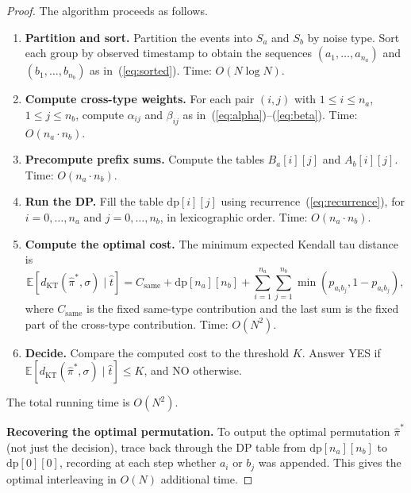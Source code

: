 \documentclass[11pt]{article}
\begin{document}
\begin{proof}
The algorithm proceeds as follows.

\begin{enumerate}
\item \textbf{Partition and sort.} Partition the events into $S_a$ and $S_b$ by noise type. Sort each group by observed timestamp to obtain the sequences $(a_1, \ldots, a_{n_a})$ and $(b_1, \ldots, b_{n_b})$ as in~(\ref{eq:sorted}). Time: $O(N \log N)$.

\item \textbf{Compute cross-type weights.} For each pair $(i, j)$ with $1 \le i \le n_a$, $1 \le j \le n_b$, compute $\alpha_{ij}$ and $\beta_{ij}$ as in~(\ref{eq:alpha})--(\ref{eq:beta}). Time: $O(n_a \cdot n_b)$.

\item \textbf{Precompute prefix sums.} Compute the tables $B_a[i][j]$ and $A_b[i][j]$. Time: $O(n_a \cdot n_b)$.

\item \textbf{Run the DP.} Fill the table $\mathrm{dp}[i][j]$ using recurrence~(\ref{eq:recurrence}), for $i = 0, \ldots, n_a$ and $j = 0, \ldots, n_b$, in lexicographic order. Time: $O(n_a \cdot n_b)$.

\item \textbf{Compute the optimal cost.} The minimum expected Kendall tau distance is
\begin{equation}
\mathbb{E}[d_{\mathrm{KT}}(\hat{\pi}^*, \sigma) \mid \hat{t}] = C_{\mathrm{same}} + \mathrm{dp}[n_a][n_b] + \sum_{i=1}^{n_a}\sum_{j=1}^{n_b} \min(p_{a_i b_j}, 1 - p_{a_i b_j}),
\end{equation}
where $C_{\mathrm{same}}$ is the fixed same-type contribution and the last sum is the fixed part of the cross-type contribution. Time: $O(N^2)$.

\item \textbf{Decide.} Compare the computed cost to the threshold $K$. Answer YES if $\mathbb{E}[d_{\mathrm{KT}}(\hat{\pi}^*, \sigma) \mid \hat{t}] \le K$, and NO otherwise.
\end{enumerate}

The total running time is $O(N^2)$.

\medskip
\noindent\textbf{Recovering the optimal permutation.} To output the optimal permutation $\hat{\pi}^*$ (not just the decision), trace back through the DP table from $\mathrm{dp}[n_a][n_b]$ to $\mathrm{dp}[0][0]$, recording at each step whether $a_i$ or $b_j$ was appended. This gives the optimal interleaving in $O(N)$ additional time.
\end{proof}
\end{document}
